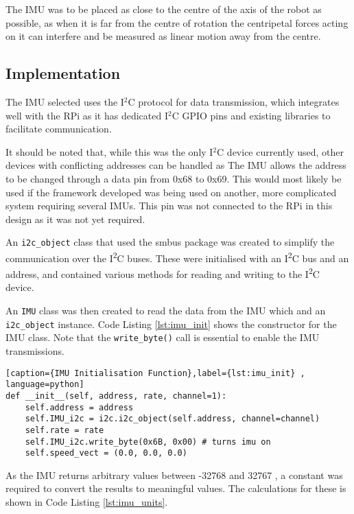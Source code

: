 The IMU was to be placed as close to the centre of the axis of the robot as possible, as when it is far from the centre of rotation the centripetal forces acting on it can interfere and be measured as linear motion away from the centre.  

\subsection{Implementation}\label{elec/imu/impl}

The IMU selected uses the I$^2$C protocol for data transmission, which integrates well with the RPi as it has dedicated I$^2$C GPIO pins and existing libraries to facilitate communication. 

It should be noted that, while this was the only I$^2$C device currently used, other devices with conflicting addresses can be handled as The IMU allows the address to be changed through a data pin from 0x68 to 0x69. This would most likely be used if the framework developed was being used on another, more complicated system requiring several IMUs. This pin was not connected to the RPi in this design as it was not yet required. 

An \verb|i2c_object| class that used the smbus package was created to simplify the communication over the I\textsuperscript{2}C buses. These were initialised with an I\textsuperscript{2}C bus and an address, and contained various methods for reading and writing to the I\textsuperscript{2}C device. 


An \verb|IMU| class was then created to read the data from the IMU which and an \verb|i2c_object| instance. Code Listing \ref{lst:imu_init} shows the constructor for the IMU class. Note that the \verb|write_byte()| call is essential to enable the IMU transmissions. 

\begin{lstlisting}[caption={IMU Initialisation Function},label={lst:imu_init} , language=python]
def __init__(self, address, rate, channel=1):
    self.address = address
    self.IMU_i2c = i2c.i2c_object(self.address, channel=channel)
    self.rate = rate
    self.IMU_i2c.write_byte(0x6B, 0x00) # turns imu on
    self.speed_vect = (0.0, 0.0, 0.0)
\end{lstlisting}

As the IMU returns arbitrary values between -32768 and 32767 , a constant was required to convert the results to meaningful values. The calculations for these is shown in Code Listing \ref{lst:imu_units}. 

